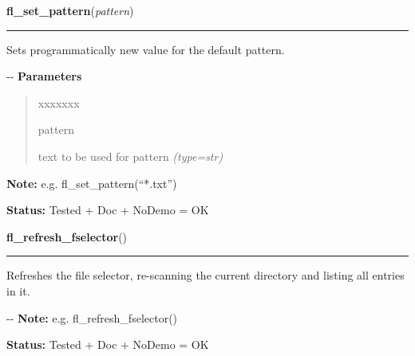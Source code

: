 \hspace{.8\funcindent}\begin{boxedminipage}{\funcwidth}

    \raggedright \textbf{fl\_set\_pattern}(\textit{pattern})

    \vspace{-1.5ex}

    \rule{\textwidth}{0.5\fboxrule}
\setlength{\parskip}{2ex}

Sets programmatically new value for the default pattern.

-{}-
\setlength{\parskip}{1ex}
      \textbf{Parameters}
      \vspace{-1ex}

      \begin{quote}
        \begin{Ventry}{xxxxxxx}

          \item[pattern]


text to be used for pattern
            {\it (type=str)}

        \end{Ventry}

      \end{quote}

\textbf{Note:} 
e.g. fl\_set\_pattern(``*.txt'')


\textbf{Status:} 
Tested + Doc + NoDemo = OK


    \end{boxedminipage}

    \label{xformslib:flgoodies:fl_refresh_fselector}

    \vspace{0.5ex}

\hspace{.8\funcindent}\begin{boxedminipage}{\funcwidth}

    \raggedright \textbf{fl\_refresh\_fselector}()

    \vspace{-1.5ex}

    \rule{\textwidth}{0.5\fboxrule}
\setlength{\parskip}{2ex}

Refreshes the file selector, re-scanning the current directory and
listing all entries in it.

-{}-
\setlength{\parskip}{1ex}
\textbf{Note:} 
e.g. fl\_refresh\_fselector()


\textbf{Status:} 
Tested + Doc + NoDemo = OK


    \end{boxedminipage}

